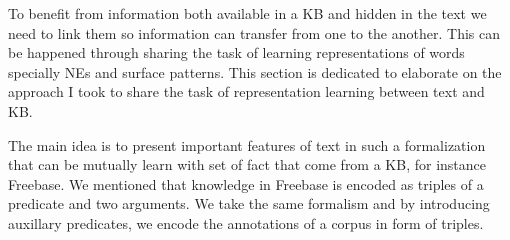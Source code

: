 To benefit from information both available in a KB and hidden in the text we
need to link them so information can transfer from one to the another. This can
be happened through sharing the task of learning representations of words
specially NEs and surface patterns. This section is dedicated to elaborate on
the approach I took to share the task of representation learning between text
and KB.

The main idea is to present important features of text in such a formalization
that can be mutually learn with set of fact that come from a KB, for instance
Freebase. We mentioned that knowledge in Freebase is encoded as triples of a
predicate and two arguments. We take the same formalism and by introducing
auxillary predicates, we encode the annotations of a corpus in form of triples.

